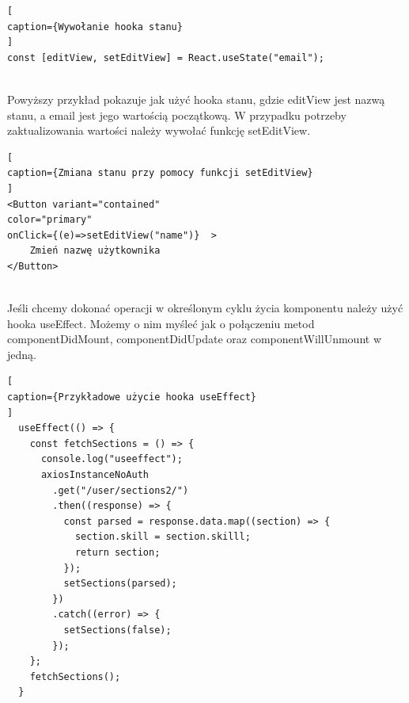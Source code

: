 \documentclass[oneside,polski,logo,indent]{amuthesis}
\begin{document}
\begin{lstlisting}[
caption={Wywołanie hooka stanu}
]
const [editView, setEditView] = React.useState("email");


\end{lstlisting}

Powyższy przykład pokazuje jak użyć hooka stanu, gdzie editView jest nazwą stanu, a email jest jego wartością początkową. W przypadku potrzeby zaktualizowania wartości należy 
wywołać funkcję setEditView.


\begin{lstlisting}[
caption={Zmiana stanu przy pomocy funkcji setEditView}
]
<Button variant="contained" 
color="primary" 
onClick={(e)=>setEditView("name")}  >
	Zmień nazwę użytkownika
</Button>


\end{lstlisting}

Jeśli chcemy dokonać operacji w określonym cyklu życia komponentu należy użyć hooka useEffect. Możemy o nim myśleć jak o połączeniu metod componentDidMount, componentDidUpdate oraz componentWillUnmount w jedną.


\begin{lstlisting}[
caption={Przykładowe użycie hooka useEffect}
]
  useEffect(() => {
    const fetchSections = () => {
      console.log("useeffect");
      axiosInstanceNoAuth
        .get("/user/sections2/")
        .then((response) => {
          const parsed = response.data.map((section) => {
            section.skill = section.skilll;
            return section;
          });
          setSections(parsed);
        })
        .catch((error) => {
          setSections(false);
        });
    };
    fetchSections();
  }


\end{lstlisting}
\end{document}
